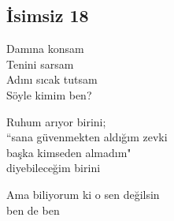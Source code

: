 \subsection{İsimsiz 18}

Damına konsam \\
Tenini sarsam \\
Adını sıcak tutsam \\
Söyle kimim ben?

\noindent\newline
Ruhum arıyor birini; \\
“sana güvenmekten aldığım zevki \\
başka kimseden almadım" \\
diyebileceğim birini

\noindent\newline
Ama biliyorum ki o sen değilsin \\
ben de ben
